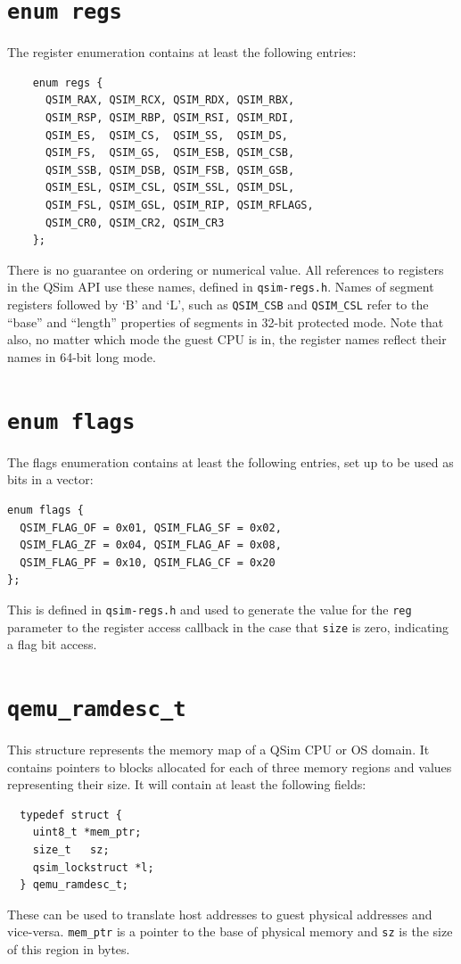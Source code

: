 \documentclass[letterpaper, 10pt]{book}
\begin{document}
\section{\texttt{enum regs}} \label{enum:regs}
The register enumeration contains at least the following entries:

\begin{verbatim}
    enum regs {
      QSIM_RAX, QSIM_RCX, QSIM_RDX, QSIM_RBX,
      QSIM_RSP, QSIM_RBP, QSIM_RSI, QSIM_RDI,
      QSIM_ES,  QSIM_CS,  QSIM_SS,  QSIM_DS,
      QSIM_FS,  QSIM_GS,  QSIM_ESB, QSIM_CSB,
      QSIM_SSB, QSIM_DSB, QSIM_FSB, QSIM_GSB,
      QSIM_ESL, QSIM_CSL, QSIM_SSL, QSIM_DSL,
      QSIM_FSL, QSIM_GSL, QSIM_RIP, QSIM_RFLAGS,
      QSIM_CR0, QSIM_CR2, QSIM_CR3
    };
\end{verbatim}

There is no guarantee on ordering or numerical value. All references to
registers in the QSim API use these names, defined in \texttt{qsim-regs.h}.
Names of segment registers followed by `B' and `L', such as \texttt{QSIM\_CSB}
and \texttt{QSIM\_CSL} refer to the ``base'' and ``length'' properties of
segments in 32-bit protected mode. Note that also, no matter which mode the 
guest CPU is in, the register names reflect their names in 64-bit long mode.
\newpage

\section{\texttt{enum flags}} \label{enum:flags}
The flags enumeration contains at least the following entries, set up to be
used as bits in a vector:

\begin{verbatim}
enum flags {
  QSIM_FLAG_OF = 0x01, QSIM_FLAG_SF = 0x02,
  QSIM_FLAG_ZF = 0x04, QSIM_FLAG_AF = 0x08,
  QSIM_FLAG_PF = 0x10, QSIM_FLAG_CF = 0x20
};
\end{verbatim}

This is defined in \texttt{qsim-regs.h} and used to generate the value for the
\texttt{reg} parameter to the register access callback in the case that
\texttt{size} is zero, indicating a flag bit access.

\section{\texttt{qemu\_ramdesc\_t}} \label{struct:qemu_ramdesc_t}
This structure represents the memory map of a QSim CPU or OS domain. It
contains pointers to blocks allocated for each of three memory regions and
values representing their size. It will contain at least the following fields:

\begin{verbatim}
  typedef struct {
    uint8_t *mem_ptr;
    size_t   sz;
    qsim_lockstruct *l;
  } qemu_ramdesc_t;
\end{verbatim}

These can be used to translate host addresses to guest physical addresses and 
vice-versa. \texttt{mem\_ptr} is a pointer to the base of physical memory and
\texttt{sz} is the size of this region in bytes.

\newpage
\end{document}
